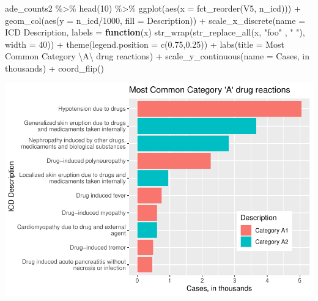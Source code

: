 \documentclass[preprint, 3p,
authoryear]{elsarticle} %
\newenvironment{Shaded}{\begin{snugshade}}{\end{snugshade}}
\newcommand{\AttributeTok}[1]{\textcolor[rgb]{0.77,0.63,0.00}{#1}}
\newcommand{\ControlFlowTok}[1]{\textcolor[rgb]{0.13,0.29,0.53}{\textbf{#1}}}
\newcommand{\DecValTok}[1]{\textcolor[rgb]{0.00,0.00,0.81}{#1}}
\newcommand{\FloatTok}[1]{\textcolor[rgb]{0.00,0.00,0.81}{#1}}
\newcommand{\FunctionTok}[1]{\textcolor[rgb]{0.00,0.00,0.00}{#1}}
\newcommand{\NormalTok}[1]{#1}
\newcommand{\SpecialCharTok}[1]{\textcolor[rgb]{0.00,0.00,0.00}{#1}}
\newcommand{\StringTok}[1]{\textcolor[rgb]{0.31,0.60,0.02}{#1}}
\begin{document}
\begin{Shaded}
\begin{Highlighting}[]
\NormalTok{ade\_counts2 }\SpecialCharTok{\%\textgreater{}\%}
  \FunctionTok{head}\NormalTok{(}\DecValTok{10}\NormalTok{) }\SpecialCharTok{\%\textgreater{}\%}
  \FunctionTok{ggplot}\NormalTok{(}\FunctionTok{aes}\NormalTok{(}\AttributeTok{x =} \FunctionTok{fct\_reorder}\NormalTok{(V5, n\_icd))) }\SpecialCharTok{+}
  \FunctionTok{geom\_col}\NormalTok{(}\FunctionTok{aes}\NormalTok{(}\AttributeTok{y =}\NormalTok{ n\_icd}\SpecialCharTok{/}\DecValTok{1000}\NormalTok{, }\AttributeTok{fill =}\NormalTok{ Description)) }\SpecialCharTok{+} 
  \FunctionTok{scale\_x\_discrete}\NormalTok{(}\AttributeTok{name =} \StringTok{\textquotesingle{}ICD Description\textquotesingle{}}\NormalTok{, }\AttributeTok{labels =} \ControlFlowTok{function}\NormalTok{(x) }\FunctionTok{str\_wrap}\NormalTok{(}\FunctionTok{str\_replace\_all}\NormalTok{(x, }\StringTok{"foo"}\NormalTok{ , }\StringTok{" "}\NormalTok{),}
                                                 \AttributeTok{width =} \DecValTok{40}\NormalTok{)) }\SpecialCharTok{+}
  \FunctionTok{theme}\NormalTok{(}\AttributeTok{legend.position =} \FunctionTok{c}\NormalTok{(}\FloatTok{0.75}\NormalTok{,}\FloatTok{0.25}\NormalTok{)) }\SpecialCharTok{+}
  \FunctionTok{labs}\NormalTok{(}\AttributeTok{title =} \StringTok{\textquotesingle{}Most Common Category }\SpecialCharTok{\textbackslash{}\textquotesingle{}}\StringTok{A}\SpecialCharTok{\textbackslash{}\textquotesingle{}}\StringTok{ drug reactions\textquotesingle{}}\NormalTok{) }\SpecialCharTok{+}
  \FunctionTok{scale\_y\_continuous}\NormalTok{(}\AttributeTok{name =} \StringTok{\textquotesingle{}Cases, in thousands\textquotesingle{}}\NormalTok{) }\SpecialCharTok{+}
  \FunctionTok{coord\_flip}\NormalTok{() }
\end{Highlighting}
\end{Shaded}

\includegraphics{final-project-paper_files/figure-latex/top-10-ade-cat-a-1.pdf}
\end{document}
